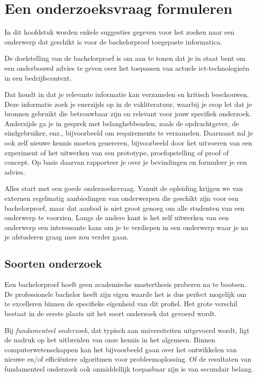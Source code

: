 \chapter{Een onderzoeksvraag formuleren}%
\label{ch:onderzoeksvraag}

In dit hoofdstuk worden enkele suggesties gegeven voor het zoeken naar een onderwerp dat geschikt is voor de bachelorproef toegepaste informatica.

De doelstelling van de bachelorproef is om aan te tonen dat je in staat bent om een onderbouwd advies te geven over het toepassen van actuele ict-technologieën in een bedrijfscontext.

Dat houdt in dat je relevante informatie kan verzamelen en kritisch beschouwen. Deze informatie zoek je enerzijds op in de vakliteratuur, waarbij je erop let dat je bronnen gebruikt die betrouwbaar zijn en relevant voor jouw specifiek onderzoek. Anderzijds ga je in gesprek met belanghebbenden, zoals de opdrachtgever, de eindgebruiker, enz., bijvoorbeeld om requirements te verzamelen. Daarnaast zal je ook zelf nieuwe kennis moeten genereren, bijvoorbeeld door het uitvoeren van een experiment of het uitwerken van een prototype, proefopstelling of proof of concept. Op basis daarvan rapporteer je over je bevindingen en formuleer je een advies.

Alles start met een goede onderzoeksvraag. Vanuit de opleiding krijgen we van externen regelmatig aanbiedingen van onderwerpen die geschikt zijn voor een bachelorproef, maar dat aanbod is niet groot genoeg om alle studenten van een onderwerp te voorzien. Langs de andere kant is het zelf uitwerken van een onderwerp een interessante kans om je te verdiepen in een onderwerp waar je na je afstuderen graag mee zou verder gaan.

\section{Soorten onderzoek}%
\label{sec:soorten-onderzoek}

Een bachelorproef hoeft geen academische masterthesis proberen na te bootsen. De professionele bachelor heeft zijn eigen waarde het is dus perfect mogelijk om te excelleren binnen de specifieke eigenheid van dit profiel. Het grote verschil bestaat in de eerste plaats uit het soort onderzoek dat gevoerd wordt.

Bij \emph{fundamenteel onderzoek}, dat typisch aan universiteiten uitgevoerd wordt, ligt de nadruk op het uitbreiden van onze kennis in het algemeen. Binnen computerwetenschappen kan het bijvoorbeeld gaan over het ontwikkelen van nieuwe en/of efficiëntere algoritmen voor probleemoplossing. Of de resultaten van fundamenteel onderzoek ook onmiddellijk toepasbaar zijn is van secundair belang.

